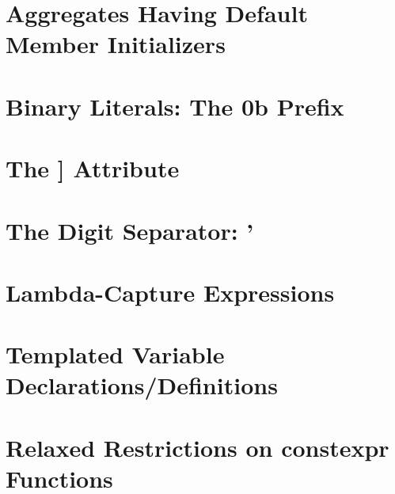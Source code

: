\renewcommand{\cppxx}{C++14}

\newpage
{}
\section[Aggregate Init '14]{Aggregates Having Default Member Initializers}\label{aggregate-member-initialization-relaxation}
\renewcommand{\cppxx}{C++14}%


\newpage
\section[Binary Literals]{Binary Literals: The {\SecCode 0b} Prefix}\label{binary-literals}


\newpage
\section[{\tt deprecated}]{The {\SecCode [[deprecated]]} Attribute}\label{deprecated}\label{the-standard-[[deprecated]]-attribute}


\newpage
\section[Digit Separators]{The Digit Separator: {\SecCode '}}
\label{digitseparator} %
\label{digit-separators} %


\newpage
\section[Lambda Captures]{Lambda-Capture Expressions}\label{lambda-capture-expressions}


\newpage
\section[Variable Templates]{Templated Variable Declarations/Definitions}
\label{variable-templates}


\newpage
\section[{\tt constexpr} Functions '14]{Relaxed Restrictions on {\SecCode constexpr} Functions}\label{relaxed-constexpr-restrictions}%




